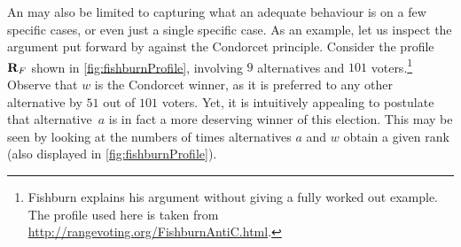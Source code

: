 \documentclass{comsoc2016}
\begin{document}
An \txtlaxiom{} may also be limited to capturing what an adequate behaviour is on a few specific cases, or even just a single specific case. As an example, let us inspect the argument put forward by \citet[p.~544]{fishburn_paradoxes_1974} against the Condorcet principle. Consider the profile $\mathbf{R}_F$ shown in \cref{fig:fishburnProfile}, involving $9$ alternatives and $101$ voters.\footnote{Fishburn explains his argument without giving a fully worked out example. The profile used here is taken from \url{http://rangevoting.org/FishburnAntiC.html}.} Observe that $w$ is the Condorcet winner, as it is preferred to any other alternative by $51$ out of $101$ voters. Yet, it is intuitively appealing to postulate that alternative~$a$ is in fact a more deserving winner of this election. This may be seen by looking at the numbers of times alternatives $a$ and $w$ obtain a given rank (also displayed in \cref{fig:fishburnProfile}).%
\end{document}
